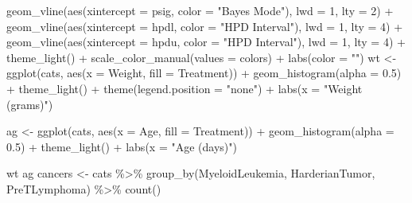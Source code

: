 \documentclass[12pt]{article}
\newenvironment{Shaded}{\begin{snugshade}}{\end{snugshade}}
\newcommand{\AttributeTok}[1]{\textcolor[rgb]{0.77,0.63,0.00}{#1}}
\newcommand{\DecValTok}[1]{\textcolor[rgb]{0.00,0.00,0.81}{#1}}
\newcommand{\FloatTok}[1]{\textcolor[rgb]{0.00,0.00,0.81}{#1}}
\newcommand{\FunctionTok}[1]{\textcolor[rgb]{0.00,0.00,0.00}{#1}}
\newcommand{\NormalTok}[1]{#1}
\newcommand{\OtherTok}[1]{\textcolor[rgb]{0.56,0.35,0.01}{#1}}
\newcommand{\SpecialCharTok}[1]{\textcolor[rgb]{0.00,0.00,0.00}{#1}}
\newcommand{\StringTok}[1]{\textcolor[rgb]{0.31,0.60,0.02}{#1}}
\begin{document}
\begin{Shaded}
\begin{Highlighting}[]
  \FunctionTok{geom\_vline}\NormalTok{(}\FunctionTok{aes}\NormalTok{(}\AttributeTok{xintercept =}\NormalTok{ psig, }\AttributeTok{color =} \StringTok{"Bayes Mode"}\NormalTok{), }\AttributeTok{lwd =} \DecValTok{1}\NormalTok{, }\AttributeTok{lty =} \DecValTok{2}\NormalTok{) }\SpecialCharTok{+}
  \FunctionTok{geom\_vline}\NormalTok{(}\FunctionTok{aes}\NormalTok{(}\AttributeTok{xintercept =}\NormalTok{ hpdl, }\AttributeTok{color =} \StringTok{"HPD Interval"}\NormalTok{), }\AttributeTok{lwd =} \DecValTok{1}\NormalTok{, }\AttributeTok{lty =} \DecValTok{4}\NormalTok{) }\SpecialCharTok{+}
  \FunctionTok{geom\_vline}\NormalTok{(}\FunctionTok{aes}\NormalTok{(}\AttributeTok{xintercept =}\NormalTok{ hpdu, }\AttributeTok{color =} \StringTok{"HPD Interval"}\NormalTok{), }\AttributeTok{lwd =} \DecValTok{1}\NormalTok{, }\AttributeTok{lty =} \DecValTok{4}\NormalTok{) }\SpecialCharTok{+}
  \FunctionTok{theme\_light}\NormalTok{() }\SpecialCharTok{+}
  \FunctionTok{scale\_color\_manual}\NormalTok{(}\AttributeTok{values =}\NormalTok{ colors) }\SpecialCharTok{+}
  \FunctionTok{labs}\NormalTok{(}\AttributeTok{color =} \StringTok{""}\NormalTok{)}
\NormalTok{wt }\OtherTok{\textless{}{-}} \FunctionTok{ggplot}\NormalTok{(cats, }\FunctionTok{aes}\NormalTok{(}\AttributeTok{x =}\NormalTok{ Weight, }\AttributeTok{fill =}\NormalTok{ Treatment)) }\SpecialCharTok{+} 
  \FunctionTok{geom\_histogram}\NormalTok{(}\AttributeTok{alpha =} \FloatTok{0.5}\NormalTok{) }\SpecialCharTok{+} 
  \FunctionTok{theme\_light}\NormalTok{() }\SpecialCharTok{+} 
  \FunctionTok{theme}\NormalTok{(}\AttributeTok{legend.position =} \StringTok{"none"}\NormalTok{) }\SpecialCharTok{+} 
  \FunctionTok{labs}\NormalTok{(}\AttributeTok{x =} \StringTok{"Weight (grams)"}\NormalTok{)}

\NormalTok{ag }\OtherTok{\textless{}{-}} \FunctionTok{ggplot}\NormalTok{(cats, }\FunctionTok{aes}\NormalTok{(}\AttributeTok{x =}\NormalTok{ Age, }\AttributeTok{fill =}\NormalTok{ Treatment)) }\SpecialCharTok{+} 
  \FunctionTok{geom\_histogram}\NormalTok{(}\AttributeTok{alpha =} \FloatTok{0.5}\NormalTok{) }\SpecialCharTok{+} 
  \FunctionTok{theme\_light}\NormalTok{() }\SpecialCharTok{+} 
  \FunctionTok{labs}\NormalTok{(}\AttributeTok{x =} \StringTok{"Age (days)"}\NormalTok{)}

\NormalTok{wt}
\NormalTok{ag}
\NormalTok{cancers }\OtherTok{\textless{}{-}}\NormalTok{ cats }\SpecialCharTok{\%\textgreater{}\%} 
  \FunctionTok{group\_by}\NormalTok{(MyeloidLeukemia, HarderianTumor, PreTLymphoma) }\SpecialCharTok{\%\textgreater{}\%}
  \FunctionTok{count}\NormalTok{()}


\end{Highlighting}
\end{Shaded}
\end{document}
